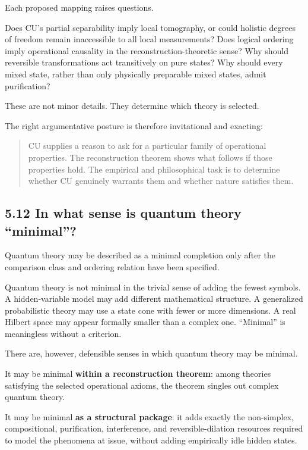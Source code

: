 \documentclass[
  11pt,
]{article}
\begin{document}
Each proposed mapping raises questions.

Does CU's partial separability imply local tomography, or could holistic
degrees of freedom remain inaccessible to all local measurements? Does
logical ordering imply operational causality in the
reconstruction-theoretic sense? Why should reversible transformations
act transitively on pure states? Why should every mixed state, rather
than only physically preparable mixed states, admit purification?

These are not minor details. They determine which theory is selected.

The right argumentative posture is therefore invitational and exacting:

\begin{quote}
CU supplies a reason to ask for a particular family of operational
properties. The reconstruction theorem shows what follows if those
properties hold. The empirical and philosophical task is to determine
whether CU genuinely warrants them and whether nature satisfies them.
\end{quote}

\subsection{5.12 In what sense is quantum theory
``minimal''?}\label{in-what-sense-is-quantum-theory-minimal}

Quantum theory may be described as a minimal completion only after the
comparison class and ordering relation have been specified.

Quantum theory is not minimal in the trivial sense of adding the fewest
symbols. A hidden-variable model may add different mathematical
structure. A generalized probabilistic theory may use a state cone with
fewer or more dimensions. A real Hilbert space may appear formally
smaller than a complex one. ``Minimal'' is meaningless without a
criterion.

There are, however, defensible senses in which quantum theory may be
minimal.

It may be minimal \textbf{within a reconstruction theorem}: among
theories satisfying the selected operational axioms, the theorem singles
out complex quantum theory.

It may be minimal \textbf{as a structural package}: it adds exactly the
non-simplex, compositional, purification, interference, and
reversible-dilation resources required to model the phenomena at issue,
without adding empirically idle hidden states.
\end{document}
